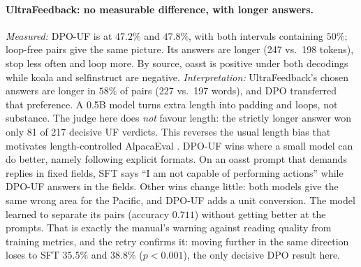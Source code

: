 \documentclass{article}
\begin{document}
\paragraph{UltraFeedback: no measurable difference, with longer answers.} \emph{Measured:} DPO-UF is at $47.2\%$ and
$47.8\%$, with both intervals containing $50\%$; loop-free pairs give the same picture. Its answers are longer
(247 vs.\ 198 tokens), stop less often and loop more. By source, oasst is positive under both decodings while koala
and selfinstruct are negative. \emph{Interpretation:} UltraFeedback's chosen answers are longer in $58\%$ of pairs
(227 vs.\ 197 words), and DPO transferred that preference. A 0.5B model turns extra length into padding and loops,
not substance. The judge here does \emph{not} favour length: the strictly longer answer won only 81 of 217 decisive
UF verdicts. This reverses the usual length bias that motivates length-controlled AlpacaEval
\citep{dubois2024lc,zheng2023judge}. DPO-UF wins where a small model can do better, namely following explicit
formats. On an oasst prompt that demands replies in fixed fields, SFT says ``I am not capable of performing actions''
while DPO-UF answers in the fields. Other wins change little: both models give the same wrong area for the Pacific,
and DPO-UF adds a unit conversion. The model learned to separate its pairs (accuracy $0.711$) without getting better
at the prompts. That is exactly the manual's warning against reading quality from training metrics, and the retry
confirms it: moving further in the same direction loses to SFT $35.5\%$ and $38.8\%$ ($p<0.001$), the only decisive
DPO result here.
\end{document}
